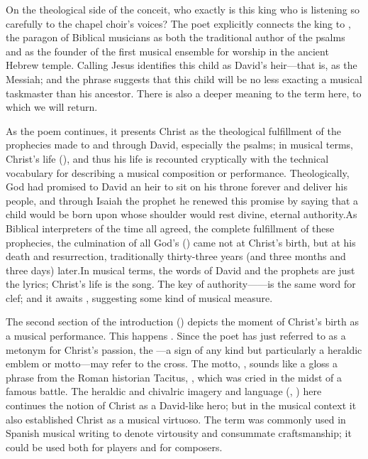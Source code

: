 On the theological side of the conceit, who exactly is this king who is
listening so carefully to the chapel choir's voices?
The poet explicitly connects the king to , the paragon
of Biblical musicians as both the traditional author of the psalms and as the
founder of the first musical ensemble for worship in the ancient Hebrew
temple.\citXXX
Calling Jesus  identifies this child as David's
heir---that is, as the Messiah; and the phrase  suggests that this child will be no less exacting a musical taskmaster
than his ancestor.
There is also a deeper meaning to the term  here, to which we will
return.

As the poem continues, it presents Christ as the theological fulfillment of the
prophecies made to and through David, especially the psalms; in musical terms,
Christ's life  (), and thus
his life is recounted cryptically with the technical vocabulary for describing a
musical composition or performance.
Theologically, God had promised to David an heir to sit on his throne forever
and deliver his people,
and through Isaiah the prophet he renewed this promise by saying that a child
would be born upon whose shoulder would rest divine, eternal
authority.
As Biblical interpreters of the time all agreed, the complete fulfillment of
these prophecies, the culmination of all God's  () came not at Christ's birth, but at his death and
resurrection, traditionally thirty-three years (and three months and three days)
later.
In musical terms, the words of David and the prophets are just the lyrics;
Christ's life is the song.
The key of authority------is the same word for clef; and it
awaits , suggesting some kind of musical measure.

The second section of the introduction () depicts the moment of
Christ's birth as a musical performance. 
This happens . 
Since the poet has just referred to  as a metonym for
Christ's passion, the ---a sign of any kind but particularly a
heraldic emblem or motto---may refer to the cross.\citXXX
The motto, , sounds like a gloss a phrase
from the Roman historian Tacitus, , which was cried in
the midst of a famous battle.\citXXX %
The heraldic and chivalric imagery and language (,
) here continues the notion of Christ as a
David-like hero; but in the musical context it also established Christ as a
musical virtuoso.
The term  was commonly used in Spanish musical writing to
denote virtousity and consummate craftsmanship; it could be used both for
players and for composers.\citXXX

